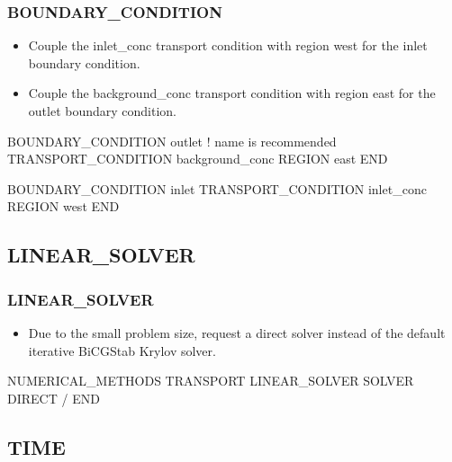 \documentclass{beamer}
\newcommand\redcomment[1]{{{\color{red} #1}}}
\newcommand\bluecomment[1]{{{\color{blue} #1}}}
\newcommand\greencomment[1]{{{\color{green} #1}}}
\begin{document}
\begin{frame}[fragile]\frametitle{BOUNDARY\_CONDITION}

\begin{itemize}
\item Couple the \greencomment{inlet\_conc} transport condition with region \greencomment{west} for the \redcomment{inlet} boundary condition.
\item Couple the \greencomment{background\_conc} transport condition with region \greencomment{east} for the \redcomment{outlet} boundary condition.
\end{itemize}

\begin{semiverbatim}

BOUNDARY_CONDITION outlet     \bluecomment{! name is recommended}
  TRANSPORT_CONDITION background_conc
  REGION east
END

BOUNDARY_CONDITION inlet
  TRANSPORT_CONDITION inlet_conc
  REGION west
END

\end{semiverbatim}

\end{frame}

\subsection{LINEAR\_SOLVER}

\begin{frame}[fragile]\frametitle{LINEAR\_SOLVER}

\begin{itemize}
\item Due to the small problem size, request a direct solver instead of the default iterative BiCGStab Krylov solver.
\end{itemize}

\begin{semiverbatim}

NUMERICAL_METHODS TRANSPORT
  LINEAR_SOLVER
    SOLVER DIRECT
  /
END

\end{semiverbatim}

\end{frame}

\subsection{TIME}
\end{document}
